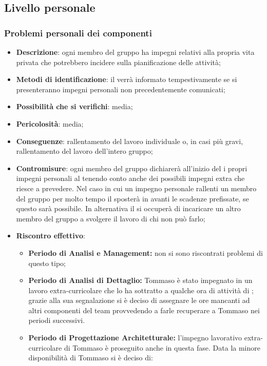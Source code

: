 	\subsection{Livello personale}
	\label{sez2.2}
		\subsubsection{Problemi personali dei componenti}
		\begin{itemize}
			\item \textbf{Descrizione}: ogni membro del gruppo ha impegni relativi alla propria vita privata che potrebbero incidere sulla pianificazione delle attività;
			\item \textbf{Metodi di identificazione}: il \RES{} verrà informato tempestivamente se si presenteranno impegni personali non precedentemente comunicati;
			\item \textbf{Possibilità che si verifichi}: media;
			\item \textbf{Pericolosità}: media;
			\item \textbf{Conseguenze}: rallentamento del lavoro individuale o, in casi più gravi, rallentamento del lavoro dell'intero gruppo;
			\item \textbf{Contromisure}: ogni membro del gruppo dichiarerà all'inizio del  i propri impegni personali al \RES{} tenendo conto anche dei possibili impegni extra che riesce a prevedere. Nel caso in cui un impegno personale rallenti un membro del gruppo per molto tempo il \RES{} sposterà in avanti le scadenze prefissate, se questo sarà possibile. In alternativa il \RES{} si occuperà di incaricare un altro membro del gruppo a svolgere il lavoro di chi non può farlo;
			\item \textbf{Riscontro effettivo}:
			\begin{itemize}
				\item \textbf{Periodo di Analisi e Management:} non si sono riscontrati problemi di questo tipo;
				\item \textbf{Periodo di Analisi di Dettaglio:} Tommaso è stato impegnato in un lavoro extra-curricolare che lo ha sottratto a qualche ora di attività di \AN; grazie alla sua segnalazione si è deciso di assegnare le ore mancanti ad altri componenti del team provvedendo a farle recuperare a Tommaso nei periodi successivi.
				\item \textbf{Periodo di Progettazione Architetturale:} l'impegno lavorativo extra-curricolare di Tommaso è proseguito anche in questa fase. Data la minore disponibilità di Tommaso si è deciso di:

\end{itemize}
\end{itemize}
